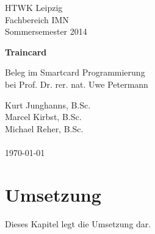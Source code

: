 \documentclass[a4paper,12pt]{scrartcl}
\begin{document}
 
\begin{titlepage}
\begin{small}
\vfill {HTWK Leipzig\\
Fachbereich IMN \\
Sommersemester 2014}
\end{small}
 
\begin{center}
\begin{Large}
\vfill {\textsf{\textbf{
Traincard\\
}}}
\end{Large}
Beleg im Smartcard Programmierung\\bei Prof. Dr. rer. nat. Uwe Petermann
\end{center}
 
\begin{small}

\vfill
Kurt Junghanns, B.Sc.\\
Marcel Kirbst, B.Sc. \\
Michael Reher, B.Sc.\\
\\
\today
\end{small}
 
\end{titlepage}
 
\tableofcontents
\clearpage
\listoffigures
\listoftables
\thispagestyle{empty}
 
\clearpage
\onehalfspacing
 
\pagestyle{plain}
 







\clearpage
\section{Umsetzung}
\label{sec:3}

Dieses Kapitel legt die Umsetzung dar.










\end{document}
